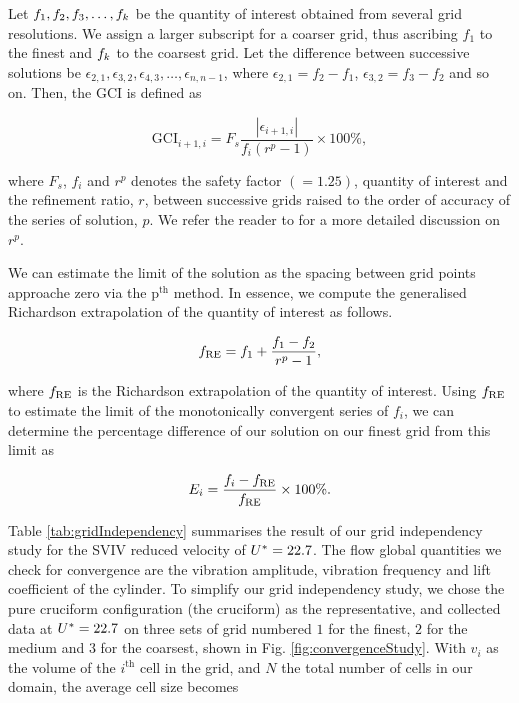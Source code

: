 \documentclass[oneside]{utmthesis}
\begin{document}
Let $f_{1},f_{2},f_{3},\dots,f_{k}$ be the quantity of interest obtained from several grid resolutions. We assign a larger subscript for a coarser grid, thus ascribing $f_{1}$ to the finest and $f_{k}$ to the coarsest grid. Let the difference between successive solutions be $\epsilon_{2,1},\epsilon_{3,2},\epsilon_{4,3},\dots,\epsilon_{n,n-1}$, where $\epsilon_{2,1} = f_{2} - f_{1}$, $\epsilon_{3,2} = f_{3} - f_{2}$ and so on. Then, the GCI is defined as

\begin{equation}
  \text{GCI}_{i+1,i} = F_{s} \frac{\left |\epsilon_{i+1,i} \right |}{f_{i} \left ( r^{p} - 1 \right )} \times 100\%,
  \label{eq:gci}
\end{equation}

\noindent where $F_{s}$, $f_{i}$ and $r^{p}$ denotes the safety factor $\left ( = 1.25 \right )$, quantity of interest and the refinement ratio, $r$, between successive grids raised to the order of accuracy of the series of solution, $p$. We refer the reader to \citet{Stern2001,Langley2018} for a more detailed discussion on $r^{p}$.

We can estimate the limit of the solution as the spacing between grid points approache zero via the $\text{p}^{\text{th}}$ method. In essence, we compute the generalised Richardson extrapolation of the quantity of interest as follows.

\begin{equation}
  f_{\text{RE}} = f_{1} + \frac{f_{1} - f_{2}}{r^{p} - 1},
  \label{eq:richardsonExtrapolation}
\end{equation}

\noindent where $f_{\text{RE}}$ is the Richardson extrapolation of the quantity of interest. Using $f_{\text{RE}}$ to estimate the limit of the monotonically convergent series of $f_{i}$, we can determine the percentage difference of our solution on our finest grid from this limit as

\begin{equation}
  E_{i} = \frac{f_{i} - f_{\text{RE}}}{f_{\text{RE}}} \times 100\%.
  \label{eq:percentageDifference}
\end{equation}

Table \ref{tab:gridIndependency} summarises the result of our grid independency study for the SVIV reduced velocity of $U^{*} = 22.7$. The flow global quantities we check for convergence are the vibration amplitude, vibration frequency and lift coefficient of the cylinder. To simplify our grid independency study, we chose the pure cruciform configuration (the \angfi{} cruciform) as the representative, and collected data at $U^{*} = 22.7$ on three sets of grid numbered $1$ for the finest, $2$ for the medium and $3$ for the coarsest, shown in Fig. \ref{fig:convergenceStudy}. With $v_{i}$ as the volume of the $i^{\text{th}}$ cell in the grid, and $N$ the total number of cells in our domain, the average cell size becomes
\end{document}
